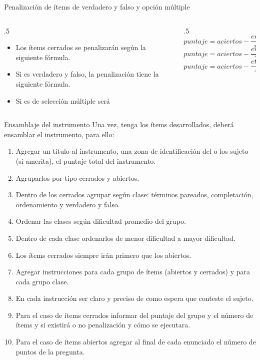 \documentclass[11pt, aspectratio=169, xcolor=table,hyphens]{beamer}
\begin{document}
\begin{frame}{Penalización de ítems de verdadero y falso y opción múltiple}
	\begin{columns}
		\begin{column}{.5\linewidth}
			\begin{itemize}
				\item Los ítems cerrados se penalizarán según la siguiente fórmula.
				\item Si es verdadero y falso, la penalización tiene la siguiente fórmula.
				\item Si es de selección múltiple será
			\end{itemize}

		\end{column}
		\begin{column}{.5\linewidth}
			\begin{equation}
				puntaje = aciertos - \frac{errores}{n-1}
			\end{equation}
			\begin{equation}
				puntaje = aciertos - \frac{errores}{2-1}
			\end{equation}
			\begin{equation}
				puntaje = aciertos - \frac{errores}{4-1}
			\end{equation}
		\end{column}
	\end{columns}
\end{frame}


\begin{frame}{Ensamblaje del instrumento}
	Una vez, tenga los ítems desarrollados, deberá ensamblar el instrumento, para ello:
	\begin{enumerate}[<+->]
		\scriptsize
		\item Agregar un título al instrumento, una zona de identificación del o los sujeto (si amerita), el puntaje total del instrumento.
		\item Agruparlos por tipo cerrados y abiertos.
		\item Dentro de los cerrados agrupar según clase: términos pareados, completación, ordenamiento y verdadero y falso.
		\item Ordenar las clases según dificultad promedio del grupo.
		\item Dentro de cada clase ordenarlos de menor dificultad a mayor dificultad.
		\item Los ítems cerrados siempre irán primero que los abiertos.
		\item Agregar instrucciones para cada grupo de ítems (abiertos y cerrados) y para cada grupo clase.
		\item En cada instrucción ser claro y preciso de como espera que conteste el sujeto.
		\item Para el caso de ítems cerrados informar del puntaje del grupo y el número de ítems y si existirá o no penalización y cómo se ejecutara.
		\item Para el caso de ítems abiertos agregar al final de cada enunciado el número de puntos de la pregunta.
	\end{enumerate}
\end{frame}
\end{document}
